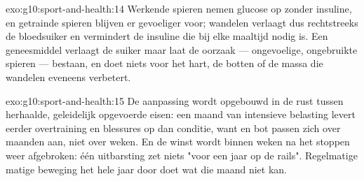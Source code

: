 \begin{solution}{exo:g10:sport-and-health:14}
Werkende spieren nemen glucose op zonder insuline, en getrainde spieren
blijven er gevoeliger voor; wandelen verlaagt dus rechtstreeks de
bloedsuiker en vermindert de insuline die bij elke maaltijd nodig is. Een
geneesmiddel verlaagt de suiker maar laat de oorzaak --- ongevoelige,
ongebruikte spieren --- bestaan, en doet niets voor het hart, de botten
of de massa die wandelen eveneens verbetert.
\end{solution}

\begin{solution}{exo:g10:sport-and-health:15}
De aanpassing wordt opgebouwd in de rust tussen herhaalde, geleidelijk
opgevoerde eisen: een maand van intensieve belasting levert eerder
overtraining en blessures op dan conditie, want  en bot passen zich
over maanden aan, niet over weken. En de winst wordt binnen weken na het
stoppen weer afgebroken: één uitbarsting zet niets "voor een jaar op de
rails". Regelmatige matige beweging het hele jaar door doet wat die maand
niet kan.
\end{solution}

